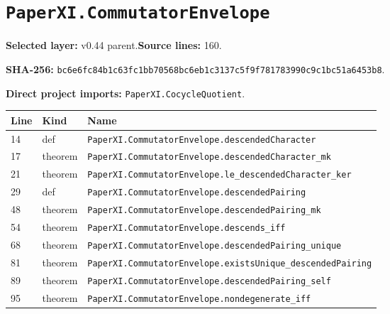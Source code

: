 \documentclass[10pt,oneside]{book}
\begin{document}
\section{\texorpdfstring{\nolinkurl{PaperXI.CommutatorEnvelope}}{PaperXI.CommutatorEnvelope}}\label{module:PaperXI.CommutatorEnvelope}

\textbf{Selected layer:} v0.44 parent.\quad\textbf{Source lines:} 160.\par\textbf{SHA-256:} {\scriptsize\nolinkurl{bc6e6fc84b1c63fc1bb70568bc6eb1c3137c5f9f781783990c9c1bc51a6453b8}}.


\textbf{Direct project imports:} \nolinkurl{PaperXI.CocycleQuotient}.

\begin{longtable}{@{}p{}p{}p{}@{}}\toprule Line&Kind&Name\\\midrule\endhead

14&def&\nolinkurl{PaperXI.CommutatorEnvelope.descendedCharacter}\\

17&theorem&\nolinkurl{PaperXI.CommutatorEnvelope.descendedCharacter_mk}\\

21&theorem&\nolinkurl{PaperXI.CommutatorEnvelope.le_descendedCharacter_ker}\\

29&def&\nolinkurl{PaperXI.CommutatorEnvelope.descendedPairing}\\

48&theorem&\nolinkurl{PaperXI.CommutatorEnvelope.descendedPairing_mk}\\

54&theorem&\nolinkurl{PaperXI.CommutatorEnvelope.descends_iff}\\

68&theorem&\nolinkurl{PaperXI.CommutatorEnvelope.descendedPairing_unique}\\

81&theorem&\nolinkurl{PaperXI.CommutatorEnvelope.existsUnique_descendedPairing}\\

89&theorem&\nolinkurl{PaperXI.CommutatorEnvelope.descendedPairing_self}\\

95&theorem&\nolinkurl{PaperXI.CommutatorEnvelope.nondegenerate_iff}\\


\end{longtable}
\end{document}
